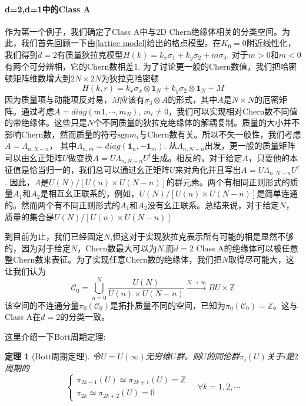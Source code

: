 \documentclass[a4paper]{article}
\numberwithin{equation}{subsection}
\newtheorem{theorem}{定理}
\begin{document}
\paragraph{d=2,d=1中的Class A}
作为第一个例子，我们确定了Class A中与2D Chern绝缘体相关的分类空间。为此，我们首先回顾一下由\eqref{lattice model}给出的格点模型。在$K_0=0$附近线性化，我们得到$d=2$有质量狄拉克模型$H(k)=k_x\sigma_1+k_y\sigma_2+m\sigma_3$. 对于$m>0$和$m<0$有两个可分辨相，它的Chern数相差$1$. 为了讨论更一般的Chern数值，我们把哈密顿矩阵维数增大到$2N\times 2N$为狄拉克哈密顿
\begin{equation}
    H(k,r)=k_x\sigma_x\otimes\mathbf{1}_N+k_y\sigma_2\otimes\mathbf{1}_N+M
\end{equation}
因为质量项与动能项反对易，$M$应该有$\sigma_3\otimes A$的形式，其中$A$是$N\times N$的厄密矩阵。通过考虑$A=diag(m1,\cdots,m_N)$, $m_i\neq 0$，我们可以实现相对Chern数不同值的带绝缘体。这些只是$N$个不同质量的狄拉克绝缘体的解耦复制。质量的大小并不影响Chern数，然而质量的符号$\mathrm{sgn}m_i$与Chern数有关。所以不失一般性，我们考虑$A=\Lambda_{n,N-n}$， 其中$\Lambda_{n,m}=diag(\mathbf{1}_n,-\mathbf{1}_m)$. 从$\Lambda_{n,N-n}$出发，更一般的质量矩阵可以由幺正矩阵$U$做变换$A=U\Lambda_{n,N-n}U^\dagger$生成。相反的，对于给定$A$，只要他的本征值是恰当归一的，我们总可以通过幺正矩阵$U$来对角化并且写出$A=U\Lambda_{n,N-n}U^\dagger$. 因此，$A$是$U(N)/[U(n)\times U(N-n)]$的群元素。两个有相同正则形式的质量$A_1$和$A_2$是相互幺正联系的，例如，$U(N)/[U(n)\times U(N-n)]$是简单连通的。然而两个有不同正则形式的$A_1$和$A_2$没有幺正联系。总结来说，对于给定$N$，质量的集合是$U(N)/[U(n)\times U(N-n)]$

到目前为止，我们已经固定$N$,但这对于实现狄拉克表示所有可能的相是显然不够的，因为对于给定$N$，Chern数最大可以为$N$,而$d=2$ Class A的绝缘体可以被任意整Chern数来表征。为了实现任意Chern数的绝缘体，我们把$N$取得尽可能大，这让我们认为
\begin{equation}
    \mathcal{C}_0=\bigcup_{n=0}^{N}\frac{U(N)}{U(n)\times U(N-n)}\stackrel{N\rightarrow\infty}{\longrightarrow} BU\times \mathbb{Z}
\end{equation}
该空间的不连通分量$\pi_0(\mathcal{C}_0)$是拓扑质量不同的空间，已知为$\pi_0(\mathcal{C}_0)=\mathbb{Z}$。这与Class A在$d=2$的分类一致。

这里介绍一下Bott周期定理:
\begin{theorem}[Bott周期定理]
    令$U=U(\infty)$无穷维$U$群。则$U$的同伦群$\pi_i(U)$关于$i$是$2$周期的
\begin{equation}
    \begin{cases}
        \pi_{2k-1}(U)\simeq\pi_{2k+1}(U)=\mathbb{Z}\\
        \pi_{2k}\simeq \pi_{2k+2}(U)=0
    \end{cases}\quad \forall k=1,2,\cdots
\end{equation}
\end{theorem}
\end{document}
